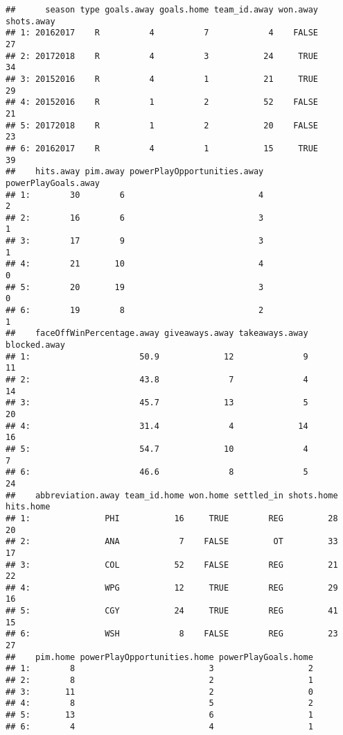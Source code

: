 \documentclass[
]{article}
\begin{document}
\begin{verbatim}
##      season type goals.away goals.home team_id.away won.away shots.away
## 1: 20162017    R          4          7            4    FALSE         27
## 2: 20172018    R          4          3           24     TRUE         34
## 3: 20152016    R          4          1           21     TRUE         29
## 4: 20152016    R          1          2           52    FALSE         21
## 5: 20172018    R          1          2           20    FALSE         23
## 6: 20162017    R          4          1           15     TRUE         39
##    hits.away pim.away powerPlayOpportunities.away powerPlayGoals.away
## 1:        30        6                           4                   2
## 2:        16        6                           3                   1
## 3:        17        9                           3                   1
## 4:        21       10                           4                   0
## 5:        20       19                           3                   0
## 6:        19        8                           2                   1
##    faceOffWinPercentage.away giveaways.away takeaways.away blocked.away
## 1:                      50.9             12              9           11
## 2:                      43.8              7              4           14
## 3:                      45.7             13              5           20
## 4:                      31.4              4             14           16
## 5:                      54.7             10              4            7
## 6:                      46.6              8              5           24
##    abbreviation.away team_id.home won.home settled_in shots.home hits.home
## 1:               PHI           16     TRUE        REG         28        20
## 2:               ANA            7    FALSE         OT         33        17
## 3:               COL           52    FALSE        REG         21        22
## 4:               WPG           12     TRUE        REG         29        16
## 5:               CGY           24     TRUE        REG         41        15
## 6:               WSH            8    FALSE        REG         23        27
##    pim.home powerPlayOpportunities.home powerPlayGoals.home
## 1:        8                           3                   2
## 2:        8                           2                   1
## 3:       11                           2                   0
## 4:        8                           5                   2
## 5:       13                           6                   1
## 6:        4                           4                   1

\end{verbatim}
\end{document}
